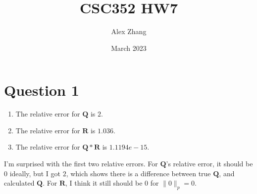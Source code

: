 \documentclass{article}
\title{CSC352 HW7}
\author{Alex Zhang}
\date{March 2023}
\newcommand{\mat}[1]{\mathbf{#1}}
\begin{document}
\maketitle

\section*{Question 1}
    \begin{enumerate}
        \item The relative error for $\mat{Q}$ is $2$.
        \item The relative error for $\mat{R}$ is $1.036$.
        \item The relative error for $\mat{Q*R}$ is $1.1194e-15$.
    \end{enumerate}
    I'm surprised with the first two relative errors. For $\mat{Q}$'s relative error, it should be $0$ ideally,
    but I got $2$, which shows there is a difference between true $\mat{Q}$, and calculated $\mat{Q}$. For $\mat{R}$, 
    I think it still should be $0$ for $\| 0\|_p = 0$. 
\end{document}
